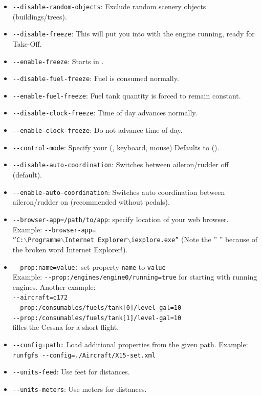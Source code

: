 \begin{itemize}
\item{\texttt{-$ $-disable-random-objects}}: Exclude random scenery objects (buildings/trees).
\item{\texttt{-$ $-disable-freeze}}: This will put you into \FlightGear{} with the
  engine running, ready for Take-Off.
\item{\texttt{-$ $-enable-freeze}}: Starts \FlightGear{} in .
\item{\texttt{-$ $-disable-fuel-freeze}}: Fuel is consumed normally.
\item{\texttt{-$ $-enable-fuel-freeze}}: Fuel tank quantity is forced to remain constant.
\item{\texttt{-$ $-disable-clock-freeze}}: Time of day advances normally.
\item{\texttt{-$ $-enable-clock-freeze}}: Do not advance time of day.
\item{\texttt{-$ $-control-mode}}: Specify your  (,
 keyboard, mouse) Defaults to  ().
\item{\texttt{-$ $-disable-auto-coordination}}: Switches  between
aileron/rudder off (default).
\item{\texttt{-$ $-enable-auto-coordination}}: Switches auto coordination between
aileron/rudder on (recommended without pedals).
\item{\texttt{-$ $-browser-app=/path/to/app}}:  specify location of your web browser. Example:
\texttt{-$ $-browser-app=}\\  \texttt{''C:$\backslash$Programme$\backslash$Internet~Explorer$\backslash$iexplore.exe''} (Note the '' '' because of the broken word Internet Explorer!).
\item{\texttt{-$ $-prop:name=value:}}  set property \texttt{name} to \texttt{value}\\Example:
\texttt{-$ $-prop:/engines/engine0/running=true} for starting with running engines. Another example:\\
\texttt{-$ $-aircraft=c172}\\
\texttt{-$ $-prop:/consumables/fuels/tank[0]/level-gal=10}\\
\texttt{-$ $-prop:/consumables/fuels/tank[1]/level-gal=10}\\
filles the Cessna for a short flight.
\item{\texttt{-$ $-config=path:}}  Load additional properties from the given path. Example: \texttt{runfgfs -$ $-config=./Aircraft/X15-set.xml}
\item{\texttt{-$ $-units-feed}}: Use feet for distances.
\item{\texttt{-$ $-units-meters}}: Use meters for distances.
\end{itemize}
